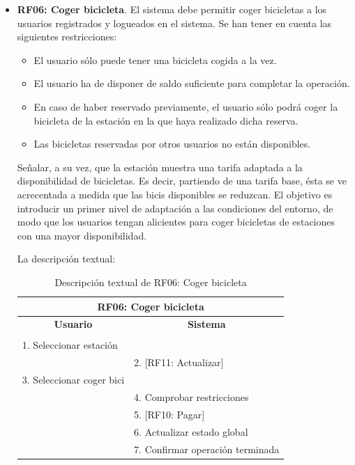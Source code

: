 \begin{itemize}
	\FloatBarrier
	\item \textbf{RF06: Coger bicicleta}. El sistema debe permitir coger bicicletas a los usuarios registrados y logueados en el sistema. Se han tener en cuenta las siguientes restricciones:
	\begin{itemize}
		\item El usuario sólo puede tener una bicicleta cogida a la vez.
		\item El usuario ha de disponer de saldo suficiente para completar la operación.
		\item En caso de haber reservado previamente, el usuario sólo podrá coger la bicicleta de la estación en la que haya realizado dicha reserva.
		\item Las bicicletas reservadas por otros usuarios no están disponibles.
	\end{itemize}
	Señalar, a su vez, que la estación muestra una tarifa adaptada a la disponibilidad de bicicletas. Es decir, partiendo de una tarifa base, ésta se ve acrecentada a medida que las bicis disponibles se reduzcan. El objetivo es introducir un primer nivel de adaptación a las condiciones del entorno, de modo que los usuarios tengan alicientes para coger bicicletas de estaciones con una mayor disponibilidad. 
	
	La descripción textual:
	\begin{table}[h]
		\centering	
		\begin{tabular}{|l|l|}
			\hline
			\multicolumn{2}{|c|}{\textbf{RF06: Coger bicicleta}} \\ \hline
			\multicolumn{1}{|c|}{\textbf{Usuario}} & \multicolumn{1}{c|}{\textbf{Sistema}} \\ \hline
			[Pto. inclusión: RF02: Loguear usuario] &\\ \hline
			1. Seleccionar estación &\\ \hline
			& 2. [RF11: Actualizar] \\ \hline
			3. Seleccionar coger bici &\\ \hline
			& 4. Comprobar restricciones \\ \hline
			& 5. [RF10: Pagar] \\ \hline
			& 6. Actualizar estado global \\ \hline
			& 7. Confirmar operación terminada \\ \hline 	
		\end{tabular}
		\caption{Descripción textual de RF06: Coger bicicleta}
		\label{tab:tablaDescTextualRF06}
	\end{table}
	

\end{itemize}
